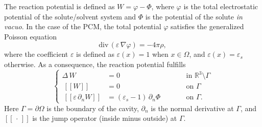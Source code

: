 \documentclass[aip,jcp,a4paper,11pt]{revtex4-1}
\newcommand{\sR}{\mathbb{R}}
\begin{document}
The reaction potential is defined as $W = \varphi - \Phi$, where $\varphi$ is the total electrostatic potential of the solute/solvent system and $\Phi$ is the potential of the solute \emph{in vacuo}. In the case of the PCM, the total potential $\varphi$ satisfies the generalized Poisson equation\cite{Mennucci_JCP_IEF1,Mennucci_JMC_IEF2}
\begin{equation}
 \label{eq:genpoisson}
\text{div} \, (\varepsilon \, \nabla \varphi) = -4\pi \rho,
\end{equation}
where the coefficient $\varepsilon$ is defined as $\varepsilon(x) = 1$ when $x \in \Omega$, and $\varepsilon(x) = \varepsilon_s$ otherwise. As a consequence, the reaction potential fulfills
\begin{equation} 
\label{eq:pcmpde}
\left \{ 
\begin{alignedat}{4}
\Delta \,  W &= 0  &&\mbox{in } \sR^3\setminus \Gamma  \\
 \ [\![W]\!] &= 0  &&\mbox{on } \Gamma\\
\  [\![\varepsilon \, \partial_n W]\!] &= (\varepsilon_s-1)\, \partial_n \Phi &\qquad& \mbox{on } \Gamma.
\end{alignedat} 
\right.
\end{equation}
Here $\Gamma=\partial\Omega$ is the boundary of the cavity, $\partial_n$ is the normal derivative at $\Gamma$, and $[\![\,\cdot\,]\!]$ is the jump operator (inside minus outside) at $\Gamma$.
\end{document}
